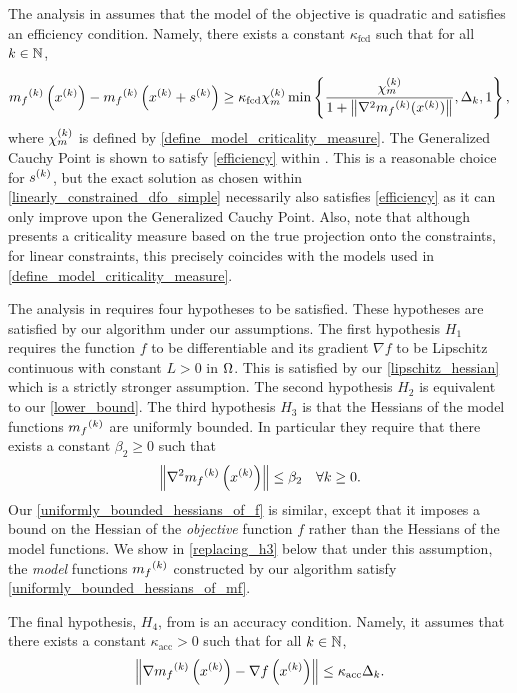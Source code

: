 \documentclass{article}
\begin{document}
The analysis in \cite{Conejo:2013:GCT:2620806.2621814}  assumes that the model of the objective is quadratic and satisfies an efficiency condition.
Namely, there exists a constant $\kappa_{\textrm{fcd}}$ such that for all $k \in \mathbb N$,

\begin{align}
\label{efficiency}
{{m}_f}^{(k)}\left(x^{(k)}\right) - {{m}_f}^{(k)}\left(x^{(k)} + {{s}^{(k)}}\right) \ge \kappa_{\textrm{fcd}} {\chi_m^{(k)}} \min\left\{ \frac{{\chi_m^{(k)}}}{1+\left\|\nabla^2 {{m}_f}^{(k)}(x^{(k)})\right\|}, \Delta_k, 1 \right\},
\end{align}
where ${\chi_m^{(k)}}$ is defined by \cref{define_model_criticality_measure}.
The Generalized Cauchy Point is shown to satisfy \cref{efficiency} within \cite{Conn:2000:TM:357813}.
This is a reasonable choice for ${{s}^{(k)}}$, but the exact solution as chosen within \cref{linearly_constrained_dfo_simple} 
necessarily also satisfies \cref{efficiency} as it can only improve upon the Generalized Cauchy Point.
Also, note that although \cite{Conejo:2013:GCT:2620806.2621814} presents a criticality measure based on the true projection onto the constraints,
for linear constraints, this precisely coincides with the models used in \cref{define_model_criticality_measure}.

The analysis in \cite{Conejo:2013:GCT:2620806.2621814} requires four hypotheses to be satisfied.  These hypotheses are satisfied by our algorithm under our assumptions.     
The first hypothesis $H_1$ requires the function $f$ to be differentiable and its gradient $\nabla f$ to be Lipschitz continuous with constant $L > 0$ in $\Omega$.  This is satisfied by our 
\cref{lipschitz_hessian} which is a strictly stronger assumption.
The second hypothesis $H_2$ is equivalent to our \cref{lower_bound}.    The third hypothesis $H_3$ is that
the Hessians of the model functions ${{m}_f}^{(k)}$ are uniformly bounded.    In particular they require that there exists a constant $\beta_2 \ge 0$ such that
\begin{equation}\label{uniformly_bounded_hessians_of_mf}
 \left\|\nabla^2 {{m}_f}^{(k)}\left(x^{(k)}\right)\right\| \le \beta_2 \quad \forall k \ge 0.
 \end{equation}
Our  \cref{uniformly_bounded_hessians_of_f}
 is similar, except that it imposes a bound on the Hessian of the {\it objective} function $f$ rather than the Hessians of the model functions.   We show in \cref{replacing_h3} below that under this assumption,  the {\it model} functions ${{m}_f}^{(k)}$ constructed by our algorithm satisfy \cref{uniformly_bounded_hessians_of_mf}.


The final hypothesis, $H_4$,  from \cite{Conejo:2013:GCT:2620806.2621814} is an accuracy condition.
Namely, it assumes that there exists a constant $\kappa_{\textrm{acc}} > 0$ such that for all $k \in \mathbb N$,
\begin{equation}
\label{accuracy}
\left\| \nabla {{m}_f}^{(k)}\left(x^{(k)}\right) - \nabla f\left(x^{(k)}\right) \right\| \le \kappa_{\textrm{acc}} \Delta_k.
\end{equation}
\end{document}

